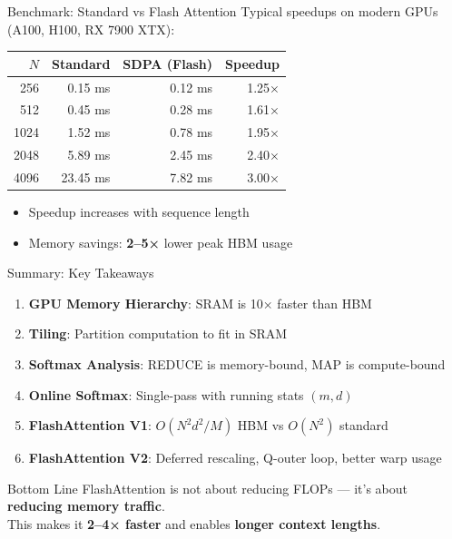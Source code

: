 \documentclass[aspectratio=169,10pt]{beamer}
\begin{document}
\begin{frame}{Benchmark: Standard vs Flash Attention}
    Typical speedups on modern GPUs (A100, H100, RX 7900 XTX):

    \vspace{0.3cm}
    \begin{table}
        \centering
        \small
        \begin{tabular}{rrrr}
            \toprule
            \textbf{$N$} & \textbf{Standard} & \textbf{SDPA (Flash)} & \textbf{Speedup} \\
            \midrule
            256 & 0.15 ms & 0.12 ms & 1.25× \\
            512 & 0.45 ms & 0.28 ms & 1.61× \\
            1024 & 1.52 ms & 0.78 ms & 1.95× \\
            2048 & 5.89 ms & 2.45 ms & 2.40× \\
            4096 & 23.45 ms & 7.82 ms & 3.00× \\
            \bottomrule
        \end{tabular}
    \end{table}

    \vspace{0.5cm}
    \begin{itemize}
        \item Speedup increases with sequence length
        \item Memory savings: \textbf{2--5×} lower peak HBM usage
    \end{itemize}


\end{frame}

\begin{frame}{Summary: Key Takeaways}
    \begin{enumerate}
        \item \textbf{GPU Memory Hierarchy}: SRAM is 10× faster than HBM
        \item \textbf{Tiling}: Partition computation to fit in SRAM
        \item \textbf{Softmax Analysis}: REDUCE is memory-bound, MAP is compute-bound
        \item \textbf{Online Softmax}: Single-pass with running stats $(m, d)$
        \item \textbf{FlashAttention V1}: $O(N^2 d^2 / M)$ HBM vs $O(N^2)$ standard
        \item \textbf{FlashAttention V2}: Deferred rescaling, Q-outer loop, better warp usage
    \end{enumerate}

    \vspace{0.5cm}
    \begin{block}{Bottom Line}
        FlashAttention is not about reducing FLOPs — it's about \textbf{reducing memory traffic}. \\
        This makes it \textbf{2--4× faster} and enables \textbf{longer context lengths}.
    \end{block}
\end{frame}
\end{document}
